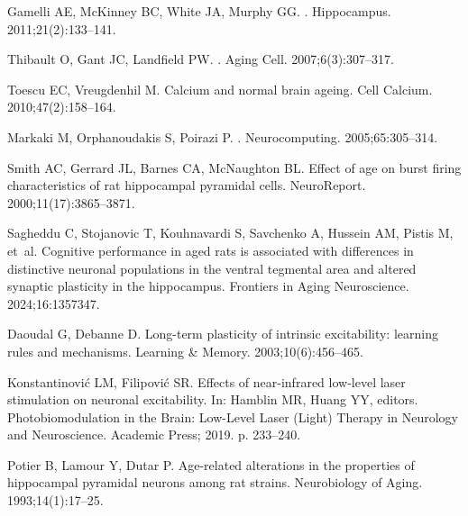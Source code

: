 \documentclass[10pt,letterpaper]{article}
\begin{document}
\begin{thebibliography}{100}
Gamelli AE, McKinney BC, White JA, Murphy GG.
.
\newblock Hippocampus. 2011;21(2):133--141.

Thibault O, Gant JC, Landfield PW.
.
\newblock Aging Cell. 2007;6(3):307--317.

Toescu EC, Vreugdenhil M.
\newblock Calcium and normal brain ageing.
\newblock Cell Calcium. 2010;47(2):158--164.

Markaki M, Orphanoudakis S, Poirazi P.
.
\newblock Neurocomputing. 2005;65:305--314.

Smith AC, Gerrard JL, Barnes CA, McNaughton BL.
\newblock Effect of age on burst firing characteristics of rat hippocampal pyramidal cells.
\newblock NeuroReport. 2000;11(17):3865--3871.

Sagheddu C, Stojanovic T, Kouhnavardi S, Savchenko A, Hussein AM, Pistis M, et~al.
\newblock Cognitive performance in aged rats is associated with differences in distinctive neuronal populations in the ventral tegmental area and altered synaptic plasticity in the hippocampus.
\newblock Frontiers in Aging Neuroscience. 2024;16:1357347.

Daoudal G, Debanne D.
\newblock Long-term plasticity of intrinsic excitability: learning rules and mechanisms.
\newblock Learning \& Memory. 2003;10(6):456--465.

Konstantinovi{\'c} LM, Filipovi{\'c} SR.
\newblock Effects of near-infrared low-level laser stimulation on neuronal excitability.
\newblock In: Hamblin MR, Huang YY, editors. Photobiomodulation in the Brain: Low-Level Laser (Light) Therapy in Neurology and Neuroscience. Academic Press; 2019. p. 233--240.

Potier B, Lamour Y, Dutar P.
\newblock Age-related alterations in the properties of hippocampal pyramidal neurons among rat strains.
\newblock Neurobiology of Aging. 1993;14(1):17--25.

\end{thebibliography}
\end{document}
